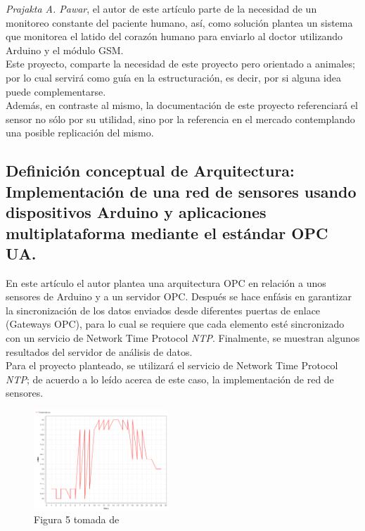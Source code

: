 \documentclass[letterpaper, 10 pt, conference]{ieeeconf}  %
\begin{document}
\textit{Prajakta A. Pawar}, el autor de este art\'iculo parte de la necesidad de un monitoreo constante del paciente humano, as\'i, como soluci\'on plantea un sistema que monitorea el latido del coraz\'on humano para enviarlo al doctor utilizando Arduino y el m\'odulo GSM.\\

Este proyecto, comparte la necesidad de este proyecto pero orientado a animales; por lo cual servir\'a como gu\'ia en la estructuraci\'on, es decir, por si alguna idea puede complementarse.\\

Adem\'as, en contraste al mismo, la documentaci\'on de este proyecto referenciar\'a el sensor no s\'olo por su utilidad, sino por la referencia en el mercado contemplando una posible replicaci\'on del mismo.


\subsection{Definici\'on conceptual de Arquitectura: Implementaci\'on de una red de sensores usando dispositivos Arduino y aplicaciones multiplataforma mediante el est\'andar OPC UA. \cite{c1}}

En este art\'iculo el autor plantea una arquitectura OPC en relaci\'on a unos sensores de Arduino y a un servidor OPC. Despu\'es se hace enf\'asis en garantizar la sincronizaci\'on de los datos enviados desde diferentes puertas de enlace (Gateways OPC), para lo cual se requiere que cada elemento est\'e sincronizado con un servicio de Network Time Protocol \textit{NTP}. Finalmente, se muestran algunos resultados del servidor de an\'alisis de datos.\\

Para el proyecto planteado, se utilizar\'a el servicio de Network Time Protocol \textit{NTP}; de acuerdo a lo le\'ido acerca de este caso, la implementaci\'on de red de sensores.

\begin{figure}
\centering
\label{fig:uno}
\includegraphics[width=0.45\textwidth]{temperatura.png}
\caption{Figura 5 tomada de \cite{c1}}
\end{figure}
\end{document}
